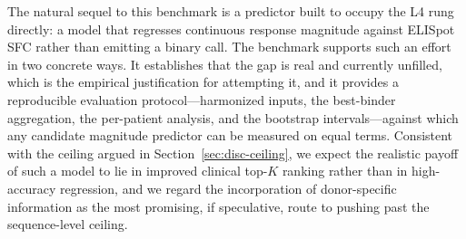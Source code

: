 The natural sequel to this benchmark is a predictor built to occupy the L4 rung
directly: a model that regresses continuous response magnitude against ELISpot
SFC rather than emitting a binary call. The benchmark supports such an effort in
two concrete ways. It establishes that the gap is real and currently unfilled,
which is the empirical justification for attempting it, and it provides a
reproducible evaluation protocol---harmonized inputs, the best-binder aggregation,
the per-patient analysis, and the bootstrap intervals---against which any
candidate magnitude predictor can be measured on equal terms. Consistent with the
ceiling argued in Section~\ref{sec:disc-ceiling}, we expect the realistic payoff
of such a model to lie in improved clinical top-$K$ ranking rather than in
high-accuracy regression, and we regard the incorporation of donor-specific
information as the most promising, if speculative, route to pushing past the
sequence-level ceiling.
